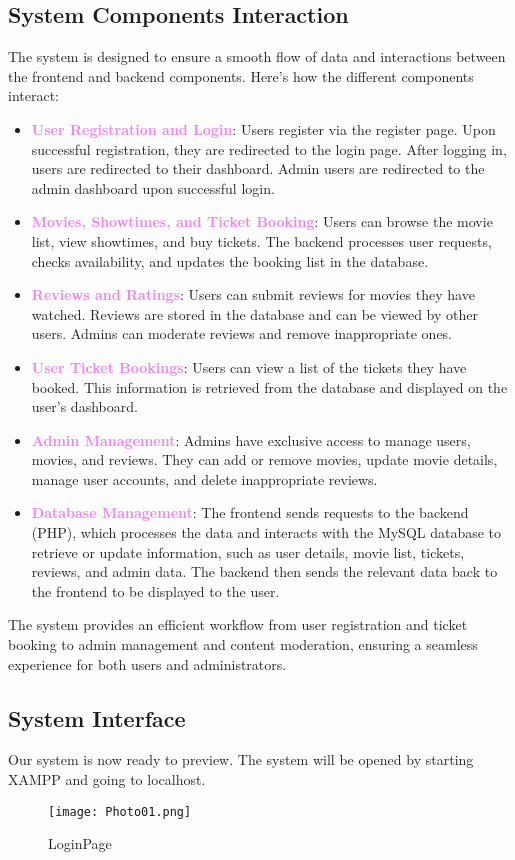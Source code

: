 \documentclass[a4paper,12pt]{article}  %
\renewcommand{\textbf}[1]{\textcolor{violet}{\bfseries #1}}
\begin{document}
\subsection{System Components Interaction}
The system is designed to ensure a smooth flow of data and interactions between the frontend and backend components. Here's how the different components interact:

\begin{itemize}
    \item \textbf{User Registration and Login}: Users register via the register page. Upon successful registration, they are redirected to the login page. After logging in, users are redirected to their dashboard. Admin users are redirected to the admin dashboard upon successful login.
    \item \textbf{Movies, Showtimes, and Ticket Booking}: Users can browse the movie list, view showtimes, and buy tickets. The backend processes user requests, checks availability, and updates the booking list in the database.
    \item \textbf{Reviews and Ratings}: Users can submit reviews for movies they have watched. Reviews are stored in the database and can be viewed by other users. Admins can moderate reviews and remove inappropriate ones.
    \item \textbf{User Ticket Bookings}: Users can view a list of the tickets they have booked. This information is retrieved from the database and displayed on the user's dashboard.
    \item \textbf{Admin Management}: Admins have exclusive access to manage users, movies, and reviews. They can add or remove movies, update movie details, manage user accounts, and delete inappropriate reviews.
    \item \textbf{Database Management}: The frontend sends requests to the backend (PHP), which processes the data and interacts with the MySQL database to retrieve or update information, such as user details, movie list, tickets, reviews, and admin data. The backend then sends the relevant data back to the frontend to be displayed to the user.
\end{itemize}

The system provides an efficient workflow from user registration and ticket booking to admin management and content moderation, ensuring a seamless experience for both users and administrators.


\subsection{System Interface}
 Our system is now ready to preview. The system will be opened by starting
 XAMPP and going to localhost.
\begin{figure}[h!]
    \centering
    \texttt{[image: Photo01.png]}
    \caption{LoginPage}
    \label{fig:photo01}
\end{figure}
\end{document}

